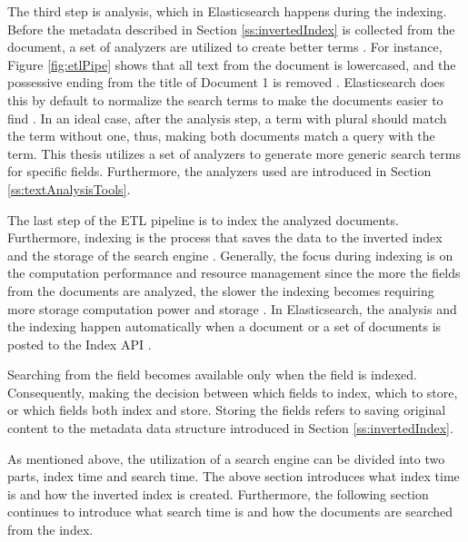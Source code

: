The third step is analysis, which in Elasticsearch happens during the indexing.
Before the metadata described in Section \ref{ss:invertedIndex} is collected from the document, 
a set of analyzers are utilized to create better terms \cite{elasticIntro}.
For instance, Figure \ref{fig:etlPipe} shows that all text from the document is lowercased, and 
the possessive ending from the title of Document 1 is removed \cite{relevantSearch}.
Elasticsearch does this by default to normalize the search terms to make the documents easier to find \cite{elasticIntro}.
In an ideal case, after the analysis step, a term with plural should match the term without one, thus, 
making both documents match a query with the term.
This thesis utilizes a set of analyzers to generate more generic search terms for specific fields.
Furthermore, the analyzers used are introduced in Section \ref{ss:textAnalysisTools}.


The last step of the ETL pipeline is to index the analyzed documents.
Furthermore, indexing is the process that saves the data to the inverted index and the storage of the search engine \cite{relevantSearch}.
Generally, the focus during indexing is on the computation performance and resource management
since the more the fields from the documents are analyzed, the slower the indexing becomes 
requiring more storage computation power and storage \cite{relevantSearch}.
In Elasticsearch, the analysis and the indexing happen automatically when 
a document or a set of documents is posted to the Index API \cite{elasticIntro}.

Searching from the field becomes available only when the field is indexed.
Consequently, making the decision between which fields to index, which to store, or which fields both index and store.
Storing the fields refers to saving original content to the metadata data structure introduced in Section \ref{ss:invertedIndex}.
\cite{relevantSearch}


As mentioned above, the utilization of a search engine can be divided into two parts, index time and search time.
The above section introduces what index time is and how the inverted index is created.
Furthermore, the following section continues to introduce what search time is and how 
the documents are searched from the index.


